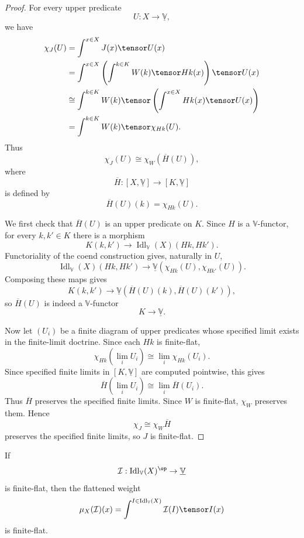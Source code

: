 \begin{proof}
For every upper predicate
\[
    U:X\to\underline{\mathbb V},
\]
we have
\[
\begin{aligned}
    \chi_J(U)
    &=
    \int^{x\in X}J(x)\tensor U(x)
    \\
    &=
    \int^{x\in X}
        \left(
            \int^{k\in K}W(k)\tensor Hk(x)
        \right)\tensor U(x)
    \\
    &\cong
    \int^{k\in K}
        W(k)\tensor
        \left(
            \int^{x\in X}Hk(x)\tensor U(x)
        \right)
    \\
    &=
    \int^{k\in K}W(k)\tensor \chi_{Hk}(U).
\end{aligned}
\]
Thus
\[
    \chi_J(U)\cong\chi_W(\overline H(U)),
\]
where
\[
    \overline H:[X,\underline{\mathbb V}]\to[K,\underline{\mathbb V}]
\]
is defined by
\[
    \overline H(U)(k)=\chi_{Hk}(U).
\]

We first check that \(\overline H(U)\) is an upper predicate on \(K\).  Since
\(H\) is a \(\mathbb V\)-functor, for every \(k,k'\in K\) there is a morphism
\[
    K(k,k')\longrightarrow
    \operatorname{Idl}_{\mathbb V}(X)(Hk,Hk').
\]
Functoriality of the coend construction gives, naturally in \(U\),
\[
    \operatorname{Idl}_{\mathbb V}(X)(Hk,Hk')
    \longrightarrow
    \underline{\mathbb V}(\chi_{Hk}(U),\chi_{Hk'}(U)).
\]
Composing these maps gives
\[
    K(k,k')\longrightarrow
    \underline{\mathbb V}(\overline H(U)(k),\overline H(U)(k')),
\]
so \(\overline H(U)\) is indeed a \(\mathbb V\)-functor
\[
    K\to\underline{\mathbb V}.
\]

Now let \((U_i)\) be a finite diagram of upper predicates whose specified limit
exists in the finite-limit doctrine.  Since each \(Hk\) is finite-flat,
\[
    \chi_{Hk}(\lim_i U_i)
    \cong
    \lim_i\chi_{Hk}(U_i).
\]
Since specified finite limits in \([K,\underline{\mathbb V}]\) are computed
pointwise, this gives
\[
    \overline H(\lim_i U_i)\cong \lim_i\overline H(U_i).
\]
Thus \(\overline H\) preserves the specified finite limits.  Since \(W\) is
finite-flat, \(\chi_W\) preserves them.  Hence
\[
    \chi_J\cong\chi_W\overline H
\]
preserves the specified finite limits, so \(J\) is finite-flat.
\end{proof}

\begin{corollary}
\label{cor:flattening-finite-flat-fdom}
If
\[
    \mathcal I:
    \operatorname{Idl}_{\mathbb V}(X)^{\op}\to\underline{\mathbb V}
\]
is finite-flat, then the flattened weight
\[
    \mu_X(\mathcal I)(x)
    =
    \int^{I\in\operatorname{Idl}_{\mathbb V}(X)}
        \mathcal I(I)\tensor I(x)
\]
is finite-flat.
\end{corollary}

